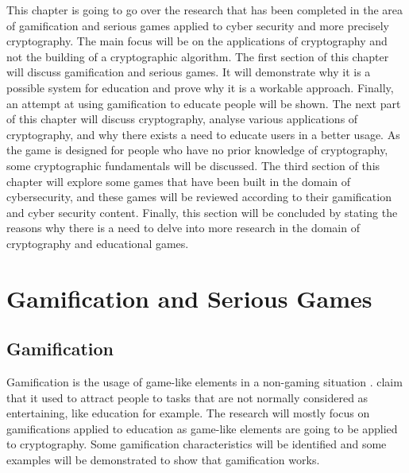 \documentclass{l4proj}
\begin{document}
This chapter is going to go over the research that has been completed in the area of gamification and serious games applied to cyber security and more precisely cryptography.
The main focus will be on the applications of cryptography and not the building of a cryptographic algorithm.
The first section of this chapter will discuss gamification and serious games. It will demonstrate why it is a possible system for education and prove why it is a workable approach.
Finally, an attempt at using gamification to educate people will be shown.
The next part of this chapter will discuss cryptography, analyse various applications of cryptography, and why there exists a need to educate users in a better usage.
As the game is designed for people who have no prior knowledge of cryptography, some cryptographic fundamentals will be discussed.
The third section of this chapter will explore some games that have been built in the domain of cybersecurity, and these games will be reviewed according to 
their gamification and cyber security content.
Finally, this section will be concluded by stating the reasons why there is a need to delve into more research in the domain of cryptography and educational games.

\section{Gamification and Serious Games}

\subsection{Gamification}
Gamification is the usage of game-like elements in a non-gaming situation \citep{aparicio_analysis_2012}.
\citet{aparicio_analysis_2012} claim that it used to attract people to tasks that are not normally considered as entertaining, like education for example.
The research will mostly focus on gamifications applied to education as game-like elements are going to be applied to cryptography.
Some gamification characteristics will be identified and some examples will be demonstrated to show that gamification works.
\end{document}
